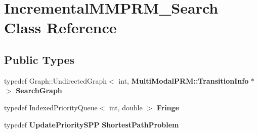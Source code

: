 \section{Incremental\+M\+M\+P\+R\+M\+\_\+\+Search Class Reference}
\label{classIncrementalMMPRM__Search}
\subsection*{Public Types}
\begin{DoxyCompactItemize}
\item 
typedef Graph\+::\+Undirected\+Graph$<$ int, {\bf Multi\+Modal\+P\+R\+M\+::\+Transition\+Info} $\ast$ $>$ {\bfseries Search\+Graph}\label{classIncrementalMMPRM__Search_a6c843752db20b17e9f7b32f2040c0421}

\item 
typedef Indexed\+Priority\+Queue$<$ int, double $>$ {\bfseries Fringe}\label{classIncrementalMMPRM__Search_a6603b26978f18e2ebf37d040eac284de}

\item 
typedef {\bf Update\+Priority\+S\+PP} {\bfseries Shortest\+Path\+Problem}\label{classIncrementalMMPRM__Search_a86e61c688846150ffcb21408a4201a9a}

\end{DoxyCompactItemize}
